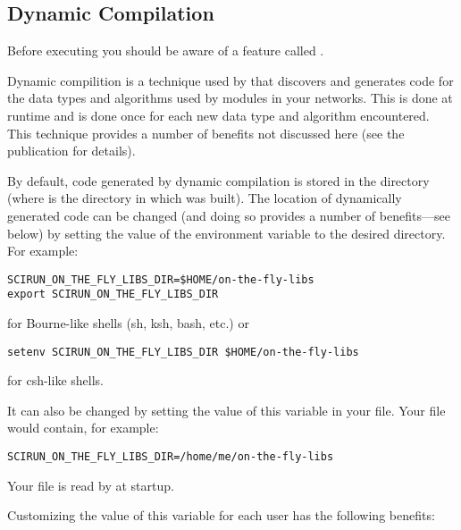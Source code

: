 \subsection{Dynamic Compilation}
\label{sec:dyncomp}

Before executing \sr{} you should be aware of a feature called
.

Dynamic compilition is a technique used by \sr{} that discovers and
generates code for the data types and algorithms used by modules in
your networks.  This is done at runtime and is done once for each new
data type and algorithm encountered.  This technique provides a number
of benefits not discussed here (see the publication 
for details).

By default, code generated by dynamic compilation is stored in the
directory  (where
 is the directory in which \sr{} was built).  The
location of dynamically generated code can be changed (and doing so
provides a number of benefits---see below) by setting the value of the
environment variable  to the
desired directory. For example:

\begin{verbatim}
SCIRUN_ON_THE_FLY_LIBS_DIR=$HOME/on-the-fly-libs
export SCIRUN_ON_THE_FLY_LIBS_DIR
\end{verbatim}

for Bourne-like shells (sh, ksh, bash, etc.) or

\begin{verbatim}
setenv SCIRUN_ON_THE_FLY_LIBS_DIR $HOME/on-the-fly-libs
\end{verbatim}

for csh-like shells.

It can also be changed by setting the value of this variable in
your 
file. Your  file would contain, for example:

\begin{verbatim}
SCIRUN_ON_THE_FLY_LIBS_DIR=/home/me/on-the-fly-libs
\end{verbatim}

Your  file is read by \sr{} at startup.

Customizing the value of this variable for each \sr{} user has
the following benefits:

